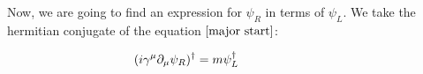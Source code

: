 Now, we are going to find an expression for $\psi_R$ in terms of $\psi_L$. We take the hermitian conjugate of the equation $\ref{major start}$:

\begin{align*}
  &\begin{aligned}
     \mathllap{(i \gamma^\mu \partial_\mu \psi_R)^\dagger}  &= m\psi_L^\dagger 
  &\end{aligned}
\end{align*}





